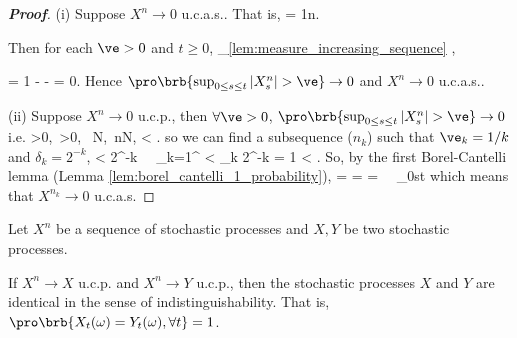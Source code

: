 \begin{proof}[\bf Proof]
\ben
\item [(i)] Suppose $X^n \to 0$ u.c.a.s.. That is,
\be
\pro{} = 1\quad {}n\to \infty.
\ee

Then for each $\ve > 0$ and $t\geq 0$,
\be
\pro{} \geq {}_{\ref{lem:measure_increasing_sequence}} \geq \pro{},
\ee

\be
\pro{} = 1 - \pro{}  - \pro{} = 0.
\ee
Hence $\pro\brb{\sup_{0\leq s\leq t}|X^n_s| > \ve} \to 0$ and $X^n \to 0$ u.c.a.s..

\item [(ii)] Suppose $X^n \to 0$ u.c.p., then $\forall \ve>0$, $\pro\brb{\sup_{0\leq s\leq t}|X^n_s| > \ve} \to 0$ i.e.
\be
\forall \ve>0,\ \delta >0, \ \exists N,\ \forall n\geq N,\quad \pro{} < \delta.
\ee
so we can find a subsequence ($n_k$) such that $\ve_k = 1/k$ and $\delta_k = 2^{-k}$,
\be
\pro{} < 2^{-k} \ \ra \ \sum_{k=1}^\infty \pro{} < \sum_k 2^{-k} = 1 < \infty.
\ee
So, by the first Borel-Cantelli lemma (Lemma \ref{lem:borel_cantelli_1_probability}),
 = \pro{} = \pro{} = \pro{} \ \ra\ \sup_{0\leq s\leq t} \nonumber
\ee
which means that $X^{n_k} \to 0$ u.c.a.s.
\een
\end{proof}



\begin{proposition}\label{pro:convergence_ucp_unique_in_sense_of_indistingushability}
Let $X^n$ be a sequence of stochastic processes and $X,Y$ be two stochastic processes.

If $X^n\to X$ u.c.p. and $X^n\to Y$ u.c.p., then the stochastic processes $X$ and $Y$ are identical in the sense of indistinguishability. That is, $\pro\brb{X_t(\omega) = Y_t(\omega), \forall t} = 1$.
\end{proposition}

